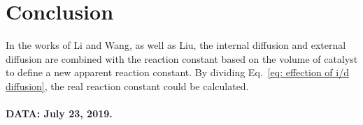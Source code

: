 \section{Conclusion}
In the works of Li and Wang, as well as Liu, the internal diffusion and external diffusion are combined with the reaction constant based on the volume of catalyst to define a new apparent reaction constant. 
By dividing Eq.~\eqref{eq: effection of i/d diffusion}, the real reaction constant could be calculated.

\paragraph{DATA: July 23, 2019. }

%
